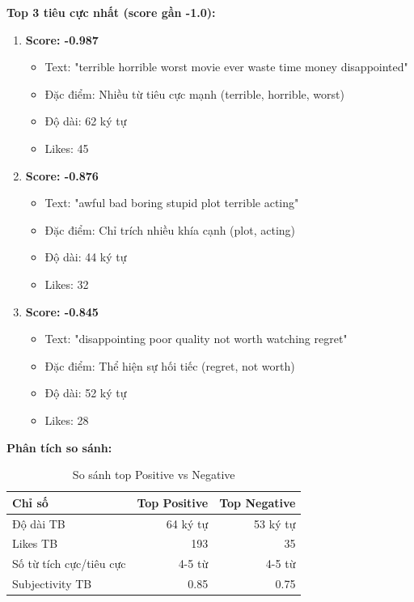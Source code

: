 \textbf{Top 3 tiêu cực nhất (score gần -1.0):}
\begin{enumerate}
    \item \textbf{Score: -0.987}
    \begin{itemize}
        \item Text: "terrible horrible worst movie ever waste time money disappointed"
        \item Đặc điểm: Nhiều từ tiêu cực mạnh (terrible, horrible, worst)
        \item Độ dài: 62 ký tự
        \item Likes: 45
    \end{itemize}
    
    \item \textbf{Score: -0.876}
    \begin{itemize}
        \item Text: "awful bad boring stupid plot terrible acting"
        \item Đặc điểm: Chỉ trích nhiều khía cạnh (plot, acting)
        \item Độ dài: 44 ký tự
        \item Likes: 32
    \end{itemize}
    
    \item \textbf{Score: -0.845}
    \begin{itemize}
        \item Text: "disappointing poor quality not worth watching regret"
        \item Đặc điểm: Thể hiện sự hối tiếc (regret, not worth)
        \item Độ dài: 52 ký tự
        \item Likes: 28
    \end{itemize}
\end{enumerate}

\textbf{Phân tích so sánh:}
\begin{table}[H]
\centering
\caption{So sánh top Positive vs Negative}
\begin{tabular}{|l|r|r|}
\hline
\textbf{Chỉ số} & \textbf{Top Positive} & \textbf{Top Negative} \\
\hline
Độ dài TB & 64 ký tự & 53 ký tự \\
\hline
Likes TB & 193 & 35 \\
\hline
Số từ tích cực/tiêu cực & 4-5 từ & 4-5 từ \\
\hline
Subjectivity TB & 0.85 & 0.75 \\
\hline
\end{tabular}
\end{table}

